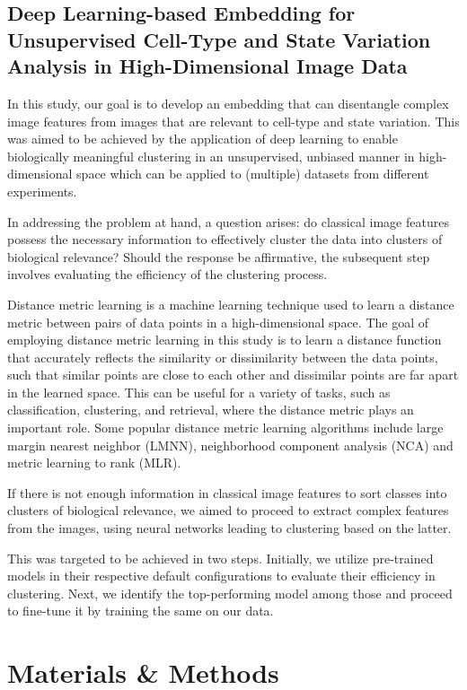 \documentclass[12pt,a4paper]{article}
\begin{document}
\subsection{Deep Learning-based Embedding for Unsupervised Cell-Type and State Variation Analysis in High-Dimensional Image Data}
In this study, our goal is to develop an embedding that can disentangle complex image features from images that are relevant to cell-type and state variation. This was aimed to be achieved by the application of deep learning to enable biologically meaningful clustering in an unsupervised, unbiased manner in high-dimensional space which can be applied to (multiple) datasets from different experiments.

In addressing the problem at hand, a question arises: do classical image features possess the necessary information to effectively cluster the data into clusters of biological relevance? Should the response be affirmative, the subsequent step involves evaluating the efficiency of the clustering process.

Distance metric learning is a machine learning technique used to learn a distance metric between pairs of data points in a high-dimensional space. The goal of employing distance metric learning in this study is to learn a distance function that accurately reflects the similarity or dissimilarity between the data points, such that similar points are close to each other and dissimilar points are far apart in the learned space. This can be useful for a variety of tasks, such as classification, clustering, and retrieval, where the distance metric plays an important role. Some popular distance metric learning algorithms include large margin nearest neighbor (LMNN), neighborhood component analysis (NCA) and metric learning to rank (MLR). 

If there is not enough information in classical image features to sort classes into clusters of biological relevance, we aimed to proceed to extract complex features from the images, using neural networks leading to clustering based on the latter.

This was targeted to be achieved in two steps. Initially, we utilize pre-trained models in their respective default configurations to evaluate their efficiency in clustering. Next, we identify the top-performing model among those and proceed to fine-tune it by training the same on our data.

\newpage
\section{Materials \& Methods}
\end{document}
